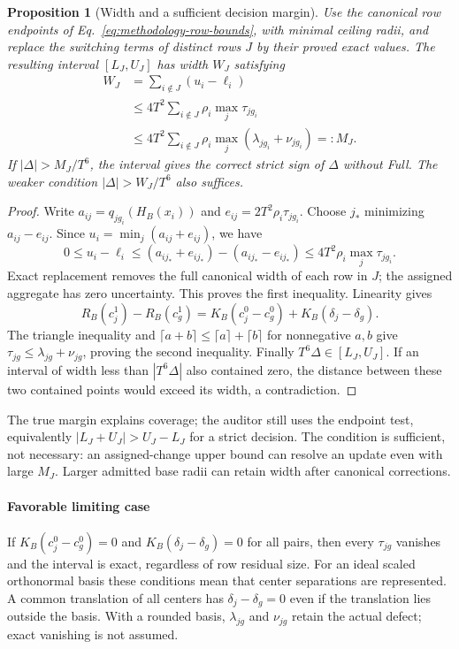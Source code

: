 \documentclass[5p,times,twocolumn]{elsarticle}
\newtheorem{proposition}{Proposition}
\begin{document}
\begin{proposition}[Width and a sufficient decision margin]
\label{prop:informativeness}
Use the canonical row endpoints of
Eq.~\eqref{eq:methodology-row-bounds}, with minimal ceiling radii, and
replace the switching terms of distinct rows $J$ by their proved exact
values. The resulting interval $[L_J,U_J]$ has width $W_J$ satisfying
\begin{align}
 W_J&=\sum_{i\notin J}(u_i-\ell_i)\nonumber\\
 &\leq 4T^2\sum_{i\notin J}\rho_i\max_j\tau_{jg_i}\nonumber\\
 &\leq 4T^2\sum_{i\notin J}\rho_i
                 \max_j(\lambda_{jg_i}+\nu_{jg_i})
       =: M_J.
 \label{eq:inform-width}
\end{align}
If $|\Delta|>M_J/T^6$, the interval gives the correct strict sign of
$\Delta$ without Full. The weaker condition $|\Delta|>W_J/T^6$ also suffices.
\end{proposition}

\begin{proof}
Write $a_{ij}=q_{jg_i}(H_B(x_i))$ and
$e_{ij}=2T^2\rho_i\tau_{jg_i}$. Choose $j_*$ minimizing
$a_{ij}-e_{ij}$. Since $u_i=\min_j(a_{ij}+e_{ij})$, we have
\[
 0\leq u_i-\ell_i
 \leq (a_{ij_*}+e_{ij_*})-(a_{ij_*}-e_{ij_*})
 \leq 4T^2\rho_i\max_j\tau_{jg_i}.
\]
Exact replacement removes the full canonical width of each row in $J$;
the assigned aggregate has zero uncertainty. This proves the first
inequality. Linearity gives
\[
 R_B(c^1_j)-R_B(c^1_g)
 =K_B(c^0_j-c^0_g)+K_B(\delta_j-\delta_g).
\]
The triangle inequality and
$\lceil a+b\rceil\leq\lceil a\rceil+\lceil b\rceil$ for nonnegative
$a,b$ give $\tau_{jg}\leq\lambda_{jg}+\nu_{jg}$, proving the second
inequality. Finally $T^6\Delta\in[L_J,U_J]$. If an interval of width
less than $|T^6\Delta|$ also contained zero, the distance between these
two contained points would exceed its width, a contradiction.
\end{proof}

The true margin explains coverage; the auditor still uses the endpoint
test, equivalently $|L_J+U_J|>U_J-L_J$ for a strict decision. The condition
is sufficient, not necessary: an assigned-change upper bound can resolve
an update even with large $M_J$. Larger admitted base radii can retain
width after canonical corrections.

\paragraph{Favorable limiting case}
If $K_B(c^0_j-c^0_g)=0$ and $K_B(\delta_j-\delta_g)=0$ for all pairs,
then every $\tau_{jg}$ vanishes and the interval is exact, regardless of
row residual size. For an ideal scaled orthonormal basis these conditions
mean that center separations are represented. A common translation of
all centers has $\delta_j-\delta_g=0$ even if the translation lies outside
the basis. With a rounded basis, $\lambda_{jg}$ and $\nu_{jg}$ retain the actual
defect; exact vanishing is not assumed.
\end{document}
